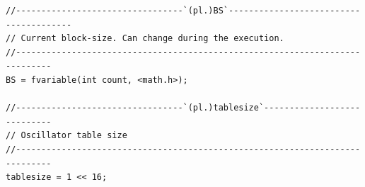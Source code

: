 \documentclass{article}
\begin{document}
\begin{lstlisting}[caption=\texttt{platform.lib}]
//---------------------------------`(pl.)BS`---------------------------------------
// Current block-size. Can change during the execution.
//-----------------------------------------------------------------------------
BS = fvariable(int count, <math.h>);

//---------------------------------`(pl.)tablesize`----------------------------
// Oscillator table size
//-----------------------------------------------------------------------------
tablesize = 1 << 16;
\end{lstlisting}
\end{document}
